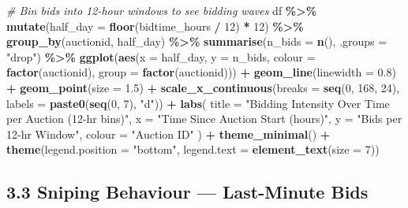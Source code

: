 \documentclass[
]{article}
\newenvironment{Shaded}{\begin{snugshade}}{\end{snugshade}}
\newcommand{\AttributeTok}[1]{\textcolor[rgb]{0.13,0.29,0.53}{#1}}
\newcommand{\CommentTok}[1]{\textcolor[rgb]{0.56,0.35,0.01}{\textit{#1}}}
\newcommand{\DecValTok}[1]{\textcolor[rgb]{0.00,0.00,0.81}{#1}}
\newcommand{\FloatTok}[1]{\textcolor[rgb]{0.00,0.00,0.81}{#1}}
\newcommand{\FunctionTok}[1]{\textcolor[rgb]{0.13,0.29,0.53}{\textbf{#1}}}
\newcommand{\NormalTok}[1]{#1}
\newcommand{\SpecialCharTok}[1]{\textcolor[rgb]{0.81,0.36,0.00}{\textbf{#1}}}
\newcommand{\StringTok}[1]{\textcolor[rgb]{0.31,0.60,0.02}{#1}}
\begin{document}
\begin{Shaded}
\begin{Highlighting}[]
\CommentTok{\# Bin bids into 12{-}hour windows to see bidding waves}
\NormalTok{df }\SpecialCharTok{\%\textgreater{}\%}
  \FunctionTok{mutate}\NormalTok{(}\AttributeTok{half\_day =} \FunctionTok{floor}\NormalTok{(bidtime\_hours }\SpecialCharTok{/} \DecValTok{12}\NormalTok{) }\SpecialCharTok{*} \DecValTok{12}\NormalTok{) }\SpecialCharTok{\%\textgreater{}\%}
  \FunctionTok{group\_by}\NormalTok{(auctionid, half\_day) }\SpecialCharTok{\%\textgreater{}\%}
  \FunctionTok{summarise}\NormalTok{(}\AttributeTok{n\_bids =} \FunctionTok{n}\NormalTok{(), }\AttributeTok{.groups =} \StringTok{"drop"}\NormalTok{) }\SpecialCharTok{\%\textgreater{}\%}
  \FunctionTok{ggplot}\NormalTok{(}\FunctionTok{aes}\NormalTok{(}\AttributeTok{x =}\NormalTok{ half\_day, }\AttributeTok{y =}\NormalTok{ n\_bids,}
             \AttributeTok{colour =} \FunctionTok{factor}\NormalTok{(auctionid), }\AttributeTok{group =} \FunctionTok{factor}\NormalTok{(auctionid))) }\SpecialCharTok{+}
  \FunctionTok{geom\_line}\NormalTok{(}\AttributeTok{linewidth =} \FloatTok{0.8}\NormalTok{) }\SpecialCharTok{+}
  \FunctionTok{geom\_point}\NormalTok{(}\AttributeTok{size =} \FloatTok{1.5}\NormalTok{) }\SpecialCharTok{+}
  \FunctionTok{scale\_x\_continuous}\NormalTok{(}\AttributeTok{breaks =} \FunctionTok{seq}\NormalTok{(}\DecValTok{0}\NormalTok{, }\DecValTok{168}\NormalTok{, }\DecValTok{24}\NormalTok{),}
                     \AttributeTok{labels =} \FunctionTok{paste0}\NormalTok{(}\FunctionTok{seq}\NormalTok{(}\DecValTok{0}\NormalTok{, }\DecValTok{7}\NormalTok{), }\StringTok{"d"}\NormalTok{)) }\SpecialCharTok{+}
  \FunctionTok{labs}\NormalTok{(}
    \AttributeTok{title   =} \StringTok{"Bidding Intensity Over Time per Auction (12{-}hr bins)"}\NormalTok{,}
    \AttributeTok{x       =} \StringTok{"Time Since Auction Start (hours)"}\NormalTok{,}
    \AttributeTok{y       =} \StringTok{"Bids per 12{-}hr Window"}\NormalTok{,}
    \AttributeTok{colour  =} \StringTok{"Auction ID"}
\NormalTok{  ) }\SpecialCharTok{+}
  \FunctionTok{theme\_minimal}\NormalTok{() }\SpecialCharTok{+}
  \FunctionTok{theme}\NormalTok{(}\AttributeTok{legend.position =} \StringTok{"bottom"}\NormalTok{,}
        \AttributeTok{legend.text =} \FunctionTok{element\_text}\NormalTok{(}\AttributeTok{size =} \DecValTok{7}\NormalTok{))}
\end{Highlighting}
\end{Shaded}

\subsection{3.3 Sniping Behaviour --- Last-Minute
Bids}\label{sniping-behaviour-last-minute-bids}
\end{document}
